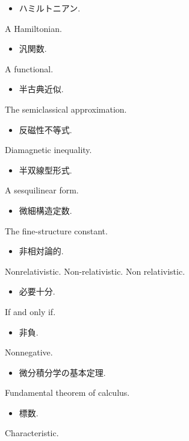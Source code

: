 \documentclass[openany, a4paper, oneside]{jsbook}
\begin{document}
\begin{itemize}
\item ハミルトニアン.
\end{itemize}
A Hamiltonian.

\begin{itemize}
\item 汎関数. \cite{LiebSeiringer1}
\end{itemize}
A functional.

\begin{itemize}
\item 半古典近似. \cite{LiebSeiringer1}
\end{itemize}
The semiclassical approximation.

\begin{itemize}
\item 反磁性不等式. \cite{LiebSeiringer1}
\end{itemize}
Diamagnetic inequality.

\begin{itemize}
\item 半双線型形式.
\end{itemize}
A sesquilinear form.

\begin{itemize}
\item 微細構造定数. \cite{LiebSeiringer1}
\end{itemize}
The fine-structure constant.

\begin{itemize}
\item 非相対論的.
\end{itemize}
Nonrelativistic. Non-relativistic. Non relativistic.

\begin{itemize}
\item 必要十分.
\end{itemize}
If and only if.

\begin{itemize}
\item 非負.
\end{itemize}
Nonnegative.

\begin{itemize}
\item 微分積分学の基本定理.
\end{itemize}
Fundamental theorem of calculus.

\begin{itemize}
\item 標数.
\end{itemize}
Characteristic.
\end{document}
